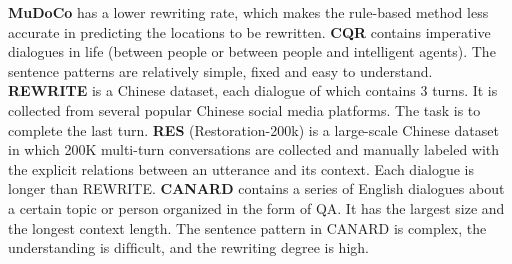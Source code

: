  
\textbf{MuDoCo} \citep{martin-etal-2020-mudoco} 
has a lower rewriting rate, which makes the rule-based method less accurate in predicting the locations to be rewritten.
\textbf{CQR} \citep{DBLP:journals/corr/abs-1903-11783} contains imperative dialogues in life (between people or between people and intelligent agents). The sentence patterns are relatively simple, fixed and easy to understand.
\textbf{REWRITE} \citep{DBLP:conf/acl/SuSZSHNZ19} is a Chinese dataset, each dialogue of which contains 3 turns. It is collected from several popular Chinese social media platforms. The task is to complete the last turn.
\textbf{RES} (Restoration-200k) \citep{DBLP:conf/emnlp/PanBWZL19} is a large-scale Chinese dataset in which 200K multi-turn conversations are collected and manually labeled with the explicit relations between an utterance and its context. Each dialogue is longer than REWRITE.
\textbf{CANARD} \citep{elgohary-etal-2019-unpack} contains a series of English dialogues about a certain topic or person organized in the form of QA. It has the largest size and the longest context length.
The sentence pattern in CANARD is complex, the understanding is difﬁcult, and the rewriting degree is high.

